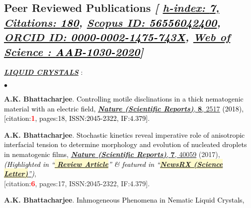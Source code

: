 \documentclass[margin,line]{res}
\newenvironment{list1}{
  \begin{list}{\ding{113}}{%
      \setlength{\itemsep}{0in}
      \setlength{\parsep}{0in} \setlength{\parskip}{0in}
      \setlength{\topsep}{0in} \setlength{\partopsep}{0in} 
      \setlength{\leftmargin}{0.17in}}}{\end{list}}
\newenvironment{list2}{
  \begin{list}{$\bullet$}{%
      \setlength{\itemsep}{0in}
      \setlength{\parsep}{0in} \setlength{\parskip}{0in}
      \setlength{\topsep}{0in} \setlength{\partopsep}{0in} 
      \setlength{\leftmargin}{0.2in}}}{\end{list}}
\begin{document}
\begin{resume}
\section{\sc Peer Reviewed Publications {\it [
\href{https://scholar.google.co.uk/citations?user=IE-ZhScAAAAJ}{h-index: \textcolor{black}{\bf 7}, 
Citations: \textcolor{black}{\bf 180}}, 
\href{https://www.scopus.com/authid/detail.uri?authorId=56556042400}{Scopus ID: \textcolor{black}{\bf 56556042400}}, 
\href{http://orcid.org/0000-0002-1475-743X}{ORCID ID: \textcolor{black}{\bf 0000-0002-1475-743X}}, 
\href{https://publons.com/researcher/3324830/amit-kumar-bhattacharjee}{Web of Science : \textcolor{black}{\bf AAB-1030-2020}}]}}
\begin{list1}
\item[] \textcolor{alizarin}{\ul{\textbf{\textit{LIQUID CRYSTALS}}} :}
\end{list1}
\vspace{2mm}
\begin{list2}
\item {\bf A.K. Bhattacharjee}. \textcolor{black}{\textsf{Controlling motile disclinations in a thick  
nematogenic material with an electric field}, \href{https://www.nature.com/articles/s41598-018-19891-0}{\underline{\textbf{\textit{Nature 
(Scientific Reports)}}}, {\bf 8}, 2517} (2018), \\{[citation:\textcolor{red}{\bf 1}, pages:18, ISSN:2045-2322, IF:4.379]}}. 
\vspace{4mm}
\item {\bf A.K. Bhattacharjee}. \textcolor{black}{\textsf{Stochastic kinetics reveal imperative role of anisotropic interfacial 
tension to determine morphology and evolution of nucleated droplets in nematogenic films}}, \href{https://www.nature.com/articles/srep40059}{\underline{\textit{\textbf{Nature (Scientific Reports)}}}, {\bf 7}, 40059} (2017),
\textcolor{black}{\small \it(Highlighted in ``\href{http://www.tandfonline.com/doi/abs/10.1080/02678292.2016.1239772}{\colorbox{lemonchiffon}{\bf 
Review Article}}'' \& featured in ``\href{http://info.newsrx.com/hubfs/Corresponding\ Author\ Email\ Campaigns/Science\ Letter\ 02.03.17.pdf}{\colorbox{lemonchiffon}{\bf NewsRX (Science Letter)}''})}, \\{[citation:\textcolor{red}{\bf 6}, pages:17, ISSN:2045-2322, IF:4.379]}.  
\vspace{4mm}
\item {\bf A.K. Bhattacharjee}. \textcolor{black}{\textsf{Inhmogeneous Phenomena in Nematic Liquid Crystals},\\ 
}
\end{list2}
\end{resume}
\end{document}
